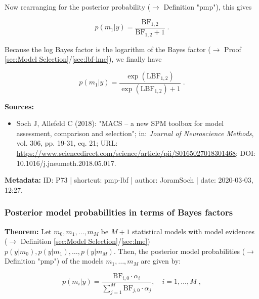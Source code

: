 \documentclass[a4paper,12pt]{book}
\begin{document}
Now rearranging for the posterior probability ($\rightarrow$ Definition "pmp"), this gives

\begin{equation} \label{eq:pmp-lbf-post-s1}
p(m_1|y) = \frac{\mathrm{BF}_{1,2}}{\mathrm{BF}_{1,2} + 1} \; .
\end{equation}

Because the log Bayes factor is the logarithm of the Bayes factor ($\rightarrow$ Proof \ref{sec:Model Selection}/\ref{sec:lbf-lme}), we finally have

\begin{equation} \label{eq:pmp-lbf-post-s2}
p(m_1|y) = \frac{\exp(\mathrm{LBF}_{1,2})}{\exp(\mathrm{LBF}_{1,2}) + 1} \; .
\end{equation}

\vspace{1em}
\textbf{Sources:}
\begin{itemize}
\item Soch J, Allefeld C (2018): "MACS – a new SPM toolbox for model assessment, comparison and selection"; in: \textit{Journal of Neuroscience Methods}, vol. 306, pp. 19-31, eq. 21; URL: \url{https://www.sciencedirect.com/science/article/pii/S0165027018301468}; DOI: 10.1016/j.jneumeth.2018.05.017.
\end{itemize}


\vspace{1em}
\textbf{Metadata:} ID: P73 | shortcut: pmp-lbf | author: JoramSoch | date: 2020-03-03, 12:27.


\subsubsection[\textbf{Posterior model probabilities in terms of Bayes factors}]{Posterior model probabilities in terms of Bayes factors} \label{sec:pmp-bf}

\vspace{1em}
\textbf{Theorem:} Let $m_0, m_1, \ldots, m_M$ be $M+1$ statistical models with model evidences ($\rightarrow$ Definition \ref{sec:Model Selection}/\ref{sec:lme}) $p(y \vert m_0), p(y \vert m_1), \ldots, p(y \vert m_M)$. Then, the posterior model probabilities ($\rightarrow$ Definition "pmp") of the models $m_1, \ldots, m_M$ are given by:

\begin{equation} \label{eq:pmp-bf-PMP-BF}
p(m_i|y) = \frac{\mathrm{BF}_{i,0} \cdot \alpha_i}{\sum_{j=1}^{M} \mathrm{BF}_{j,0} \cdot \alpha_j}, \quad i = 1,\ldots,M \; ,
\end{equation}
\end{document}
